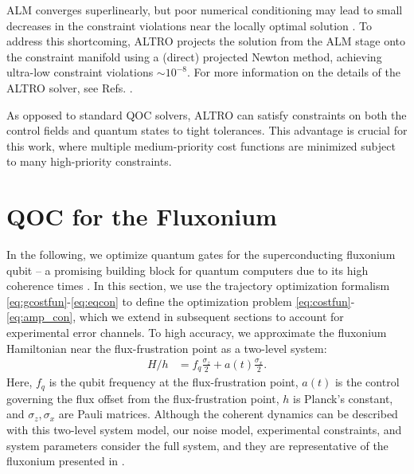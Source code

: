 \documentclass[
  amsfonts,
  amsmath,
  amssymb,
  pra,
  twocolumn,
  superscriptaddress,
]{revtex4-2}
\begin{document}
ALM converges superlinearly, but poor numerical conditioning may lead
to small decreases in the constraint violations near the locally optimal solution
\cite{bertsekas2014constrained}.
To address this shortcoming, ALTRO
projects the solution from the ALM stage onto the constraint manifold using
a (direct) projected Newton method, achieving ultra-low
constraint violations $\sim 10^{-8}$.
For more information on the details of the ALTRO
solver, see Refs. \cite{howell2019altro, Jackson2020altroc}.

As opposed to standard QOC solvers, ALTRO
can satisfy constraints on both the control fields and quantum states to tight tolerances.
This advantage is crucial for this work, where multiple medium-priority cost functions
are minimized subject to many high-priority constraints.


\section{QOC for the Fluxonium \label{sec:fluxonium}}
In the following, we optimize quantum gates
for the superconducting fluxonium qubit -- a promising
building block for quantum computers due to its high
coherence times
\cite{earnest2018realization, lin2018demonstration,
  manucharyan2009fluxonium, somoroff2021millisecond, nguyen2019high,
  zhang2020universal}.
In this section, we use the trajectory optimization
formalism \eqref{eq:gcostfun}-\eqref{eq:eqcon}
to define the optimization problem \eqref{eq:costfun}-\eqref{eq:amp_con},
which we extend in subsequent sections to account
for experimental error channels.
To high accuracy, we approximate the fluxonium Hamiltonian near the flux-frustration
point as a two-level system:
\begin{align}
  H/h &= f_{q} \frac{\sigma_{z}}{2} + a(t) \frac{\sigma_{x}}{2}.
  \label{eq:hamiltonian}
\end{align}
Here, $f_{q}$ is the qubit frequency at the flux-frustration point,
$a(t)$ is the control governing the flux offset from the flux-frustration point,
$h$ is Planck's constant, and $\sigma_{z}, \sigma_{x}$
are Pauli matrices. Although the coherent dynamics can be described with this two-level
system model, our noise model, experimental constraints, and system parameters
consider the full system, and they are representative of the fluxonium
presented in \cite{zhang2020universal}.
\end{document}
